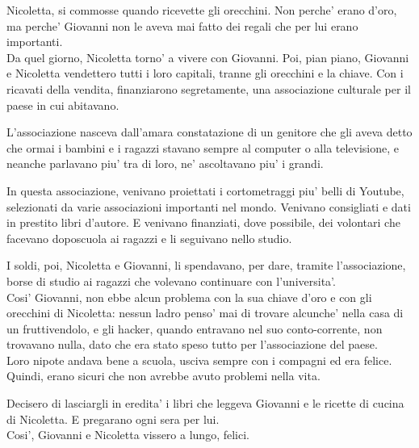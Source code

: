 Nicoletta, si commosse quando ricevette gli orecchini. Non perche' erano d'oro, ma perche' Giovanni non le aveva mai fatto dei regali che per lui erano importanti.\\

Da quel giorno, Nicoletta torno' a vivere con Giovanni. Poi, pian piano, Giovanni e Nicoletta vendettero tutti i loro capitali, tranne gli orecchini e la chiave. Con i ricavati della vendita, finanziarono segretamente, una associazione culturale per il paese in cui abitavano.

L'associazione nasceva dall'amara constatazione di un genitore che gli aveva detto che ormai i bambini e i ragazzi stavano sempre al computer o alla televisione, e neanche parlavano piu' tra di loro, ne' ascoltavano piu' i grandi.

In questa associazione, venivano proiettati i cortometraggi piu' belli di Youtube, selezionati da varie associazioni importanti nel mondo. Venivano consigliati e dati in prestito libri d'autore. E venivano finanziati, dove possibile, dei volontari che facevano doposcuola ai ragazzi e li seguivano nello studio.

I soldi, poi, Nicoletta e Giovanni, li spendavano, per dare, tramite l'associazione, borse di studio ai ragazzi che volevano continuare con l'universita'.\\

Cosi' Giovanni, non ebbe alcun problema con la sua chiave d'oro e con gli orecchini di Nicoletta: nessun ladro penso' mai di trovare alcunche' nella casa di un fruttivendolo, e gli hacker, quando entravano nel suo conto-corrente, non trovavano nulla, dato che era stato speso tutto per l'associazione del paese.\\

Loro nipote andava bene a scuola, usciva sempre con i compagni ed era felice. Quindi, erano sicuri che non avrebbe avuto problemi nella vita.

Decisero di lasciargli in eredita' i libri che leggeva Giovanni e le ricette di cucina di Nicoletta. E pregarano ogni sera per lui.\\

Cosi', Giovanni e Nicoletta vissero a lungo, felici.
